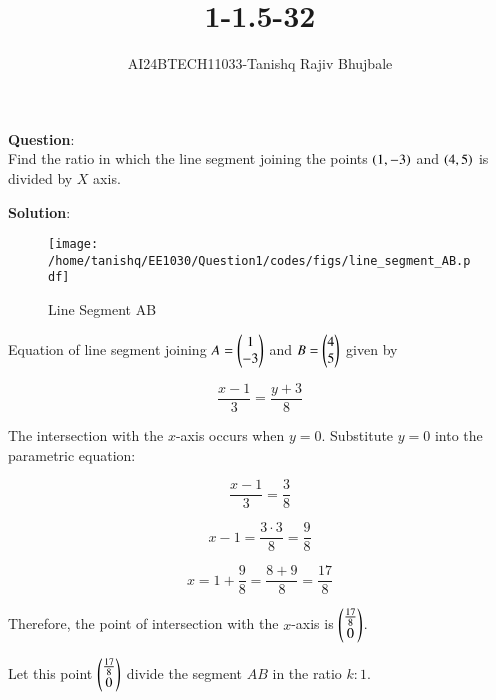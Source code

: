 \documentclass[journal]{IEEEtran}
\begin{document}

\vspace{3cm}

\title{1-1.5-32}
\author{AI24BTECH11033-Tanishq Rajiv Bhujbale}
{\let\newpage\relax\maketitle}

\renewcommand{\thefigure}{\theenumi}
\renewcommand{\thetable}{\theenumi}
\setlength{\intextsep}{10pt} %


\renewcommand{\thetable}{\theenumi}


\textbf{Question}:\\
Find the ratio in which the line segment joining the points $\left(1,-3\right)$ and $\left(4, 5\right)$ is divided by $X$ axis.


\textbf{Solution}:\\

\begin{figure}[h!]
    \centering
    \texttt{[image: /home/tanishq/EE1030/Question1/codes/figs/line\_segment\_AB.pdf]}
    \caption{Line Segment AB}
    \label{fig:line_segment_AB}
\end{figure}


Equation of line segment joining $A =\begin{pmatrix}1 \\ -3\end{pmatrix}$ and $B= \begin{pmatrix}4 \\ 5\end{pmatrix}$ given by

   $$\frac{x-1}{3}=\frac{y+3}{8}$$

   The intersection with the $x$-axis occurs when $y=0$. Substitute $y=0$ into the parametric equation:

   $$\frac{x-1}{3}=\frac{3}{8}$$

   $$x-1=\frac{3 \cdot 3}{8}=\frac{9}{8}$$

   $$x=1+\frac{9}{8}=\frac{8+9}{8}=\frac{17}{8}$$

   Therefore, the point of intersection with the $x$-axis is $\begin{pmatrix}\frac{17}{8} \\ 0\end{pmatrix}$.

   Let this point $\begin{pmatrix}\frac{17}{8} \\ 0 \end{pmatrix} $ divide the segment $AB$ in the ratio $k:1$. 
   
\end{document}
